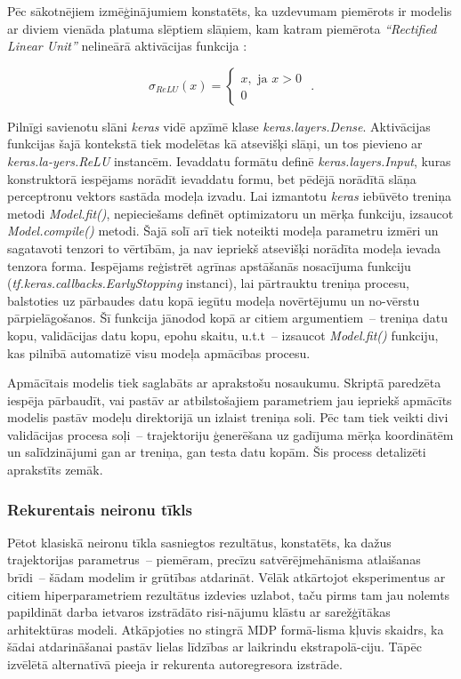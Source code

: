 \documentclass[12pt, a4paper]{article}
\numberwithin{equation}{section} %
\begin{document}
Pēc sākotnējiem izmēģinājumiem konstatēts, ka uzdevumam piemērots ir modelis ar diviem vienāda platuma slēptiem slāņiem, kam katram piemērota \textit{``Rectified Linear Unit''} nelineārā aktivācijas funkcija \cite{tf_relu}:

\begin{equation}
    \sigma_{ReLU}(x) = 
    \begin{cases}
        x, \text{ ja } x > 0 \\
        0
    \end{cases}
\text{ .}
\end{equation}

Pilnīgi savienotu slāni \textit{keras} vidē apzīmē klase \textit{keras.layers.Dense}. Aktivācijas funkcijas šajā kontekstā tiek modelētas kā atsevišķi slāņi, un tos pievieno ar \textit{keras.la-yers.ReLU} instancēm. Ievaddatu formātu definē \textit{keras.layers.Input}, kuras konstruktorā iespējams norādīt ievaddatu formu, bet pēdējā norādītā slāņa perceptronu vektors sastāda modeļa izvadu. Lai izmantotu \textit{keras} iebūvēto treniņa metodi \textit{Model.fit()}, nepieciešams definēt optimizatoru un mērķa funkciju, izsaucot \textit{Model.compile()} metodi. Šajā solī arī tiek noteikti modeļa parametru izmēri un sagatavoti tenzori to vērtībām, ja nav iepriekš atsevišķi norādīta modeļa ievada tenzora forma. Iespējams reģistrēt agrīnas apstāšanās nosacījuma funkciju (\textit{tf.keras.callbacks.EarlyStopping} instanci), lai pārtrauktu treniņa procesu, balstoties uz pārbaudes datu kopā iegūtu modeļa novērtējumu un no-vērstu pārpielāgošanos. Šī funkcija jānodod kopā ar citiem argumentiem~-- treniņa datu kopu, validācijas datu kopu, epohu skaitu, u.t.t~-- izsaucot \textit{Model.fit()} funkciju, kas pilnībā automatizē visu modeļa apmācības procesu.

Apmācītais modelis tiek saglabāts ar aprakstošu nosaukumu. Skriptā paredzēta iespēja pārbaudīt, vai pastāv ar atbilstošajiem parametriem jau iepriekš apmācīts modelis pastāv modeļu direktorijā un izlaist treniņa soli. Pēc tam tiek veikti divi validācijas procesa soļi~-- trajektoriju ģenerēšana uz gadījuma mērķa koordinātēm un salīdzinājumi gan ar treniņa, gan testa datu kopām. Šis process detalizēti aprakstīts zemāk.

\subsubsection{Rekurentais neironu tīkls}

Pētot klasiskā neironu tīkla sasniegtos rezultātus, konstatēts, ka dažus trajektorijas parametrus~-- piemēram, precīzu satvērējmehānisma atlaišanas brīdi~-- šādam modelim ir grūtības atdarināt. Vēlāk atkārtojot eksperimentus ar citiem hiperparametriem rezultātus izdevies uzlabot, taču pirms tam jau nolemts papildināt darba ietvaros izstrādāto risi-nājumu klāstu ar sarežģītākas arhitektūras modeli. Atkāpjoties no stingrā MDP formā-lisma kļuvis skaidrs, ka šādai atdarināšanai pastāv lielas līdzības ar laikrindu ekstrapolā-ciju. Tāpēc izvēlētā alternatīvā pieeja ir rekurenta autoregresora izstrāde.
\end{document}
